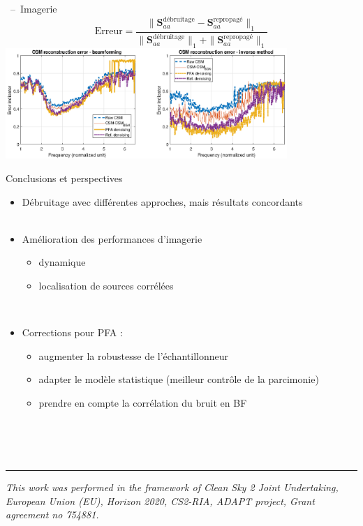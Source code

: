 \documentclass[10pt,xcolor=x11names,compress, show notes]{beamer}%
\begin{document}
\begin{frame}{\insertsectionhead~--~Imagerie}
	\centering
	\small
	\begin{equation*}
        		\text{Erreur} = \frac{\|\bm{S}_{aa}^{\text{débruitage}}-\bm{S}_{aa}^{\text{repropagé}}\|_1}{\|\bm{S}_{aa}^{\text{débruitage}}\|_1+\|\bm{S}_{aa}^{\text{repropagé}}\|_1}
	\end{equation*}
	\vfill
	\includegraphics[width=0.8\textwidth]{airbus/erreur.eps}
\end{frame}

\begin{frame}{Conclusions et perspectives}
\begin{itemize}
	\item Débruitage avec différentes approches, mais résultats concordants\\~\\
        \item Amélioration des performances d'imagerie
        \begin{itemize}
       		 \item dynamique
        		\item localisation de sources corrélées
	\end{itemize}~\\
	
	\item Corrections pour PFA :
	\begin{itemize}
        		\item augmenter la robustesse de l'échantillonneur
        		\item adapter le modèle statistique (meilleur contrôle de la parcimonie)
        		\item prendre en compte la corrélation du bruit en BF
	\end{itemize}
\end{itemize}

~\\~\\~\\
\vfill
\begin{center}
	\noindent\rule{\textwidth}{0.4pt}
	\scriptsize \itshape{
	This work was performed in the framework of Clean Sky 2 Joint Undertaking, European Union (EU), Horizon 2020, CS2-RIA, ADAPT project, Grant agreement no 754881.}\\
\end{center}
\end{frame}
\end{document}
